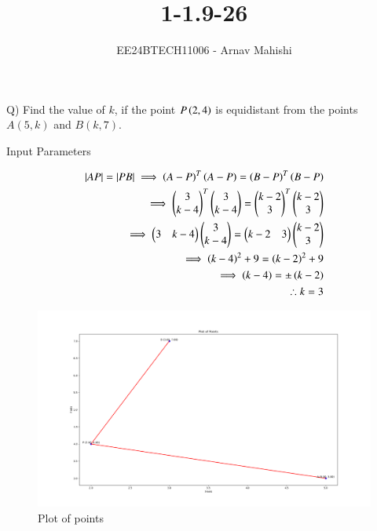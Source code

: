 \documentclass[journal]{IEEEtran}
\begin{document}

\vspace{3cm}

\title{1-1.9-26}
\author{EE24BTECH11006 - Arnav Mahishi}
{\let\newpage\relax\maketitle}

\renewcommand{\thefigure}{\theenumi}
\renewcommand{\thetable}{\theenumi}
\setlength{\intextsep}{10pt} %


\renewcommand{\thetable}{\theenumi}
Q) Find the value of $k$, if the point $P\left(2,4\right)$ is equidistant from the points $A(5,k)$ and $B(k,7)$.\\

\begin{table}[h!]    
  \centering
  
  \caption{Input Parameters}
\end{table}
\begin{align}
\left\vert AP\right\vert=\left\vert PB\right\vert\implies
\left(A-P\right)^T\left(A-P\right)=\left(B-P\right)^T\left(B-P\right)\\
\implies\begin{pmatrix}3\\k-4\end{pmatrix}^T\begin{pmatrix}3\\k-4\end{pmatrix}=\begin{pmatrix}k-2\\3\end{pmatrix}^T\begin{pmatrix}k-2\\3\end{pmatrix}\\
\implies\begin{pmatrix}3&k-4\end{pmatrix}\begin{pmatrix}3\\k-4\end{pmatrix}=\begin{pmatrix}k-2&3\end{pmatrix}\begin{pmatrix}k-2\\3\end{pmatrix}\\
\implies\left(k-4\right)^2+9=\left(k-2\right)^2+9\\
\implies\left(k-4\right)=\pm\left(k-2\right)\\
\therefore k=3
\end{align}
\begin{figure}[h!]
   \centering
   \includegraphics[width=0.7\linewidth]{figs/Figure_1.png}
   \caption{Plot of points}
   \label{stemplot}
\end{figure}
\end{document}
